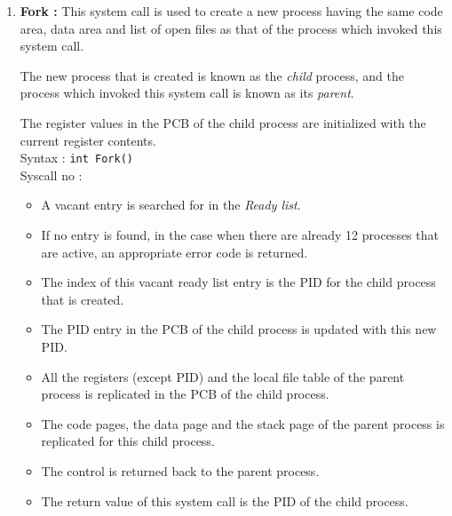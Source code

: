 \begin{enumerate}
	\item  \textbf{Fork :}  This system call is used to create a new process having the same code area, data area and list of open files as that of the process which invoked this system call.
	
	The new process that is created is known as the \emph{child} process, and the process which invoked this system call is known as its \emph{parent}.
	
	The register values in the PCB of the child process are initialized with the current register contents.\\
	Syntax : \texttt{int Fork()} \\
	Syscall no : 
	\begin{itemize}
		\item A vacant entry is searched for in the \emph{Ready list}.
		\item If no entry is found, in the case when there are already 12 processes that are active, an appropriate error code is returned.
		\item The index of this vacant ready list entry is the PID for the child process that is created.
		\item The PID entry in the PCB of the child process is updated with this new PID.
		\item All the registers (except PID) and the local file table of the parent process is replicated in the PCB of the child process.
		\item The code pages, the data page and the stack page of the parent process is replicated for this child process.
		\item The control is returned back to the parent process.
		\item The return value of this system call is the PID of the child process.
	\end{itemize}


\end{enumerate}
